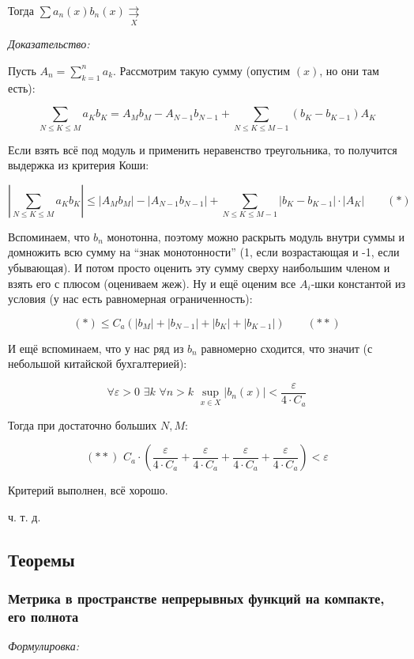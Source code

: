 \documentclass{article}
\def\dbl{\,\,}
\def\rsh#1{\underset{#1}{\rightrightarrows}}
\begin{document}
Тогда $\sum a_n(x) b_n(x) \rsh{X}$

\textit{Доказательство:}

Пусть $A_n = \sum_{k = 1}^n a_k$. Рассмотрим такую сумму (опустим $(x)$, но они там есть): 

\[
    \sum_{N \le K \le M} {a_K b_K} = A_Mb_M - A_{N - 1}b_{N - 1} + \sum_{N \le K \le M - 1} {(b_K - b_{K - 1})A_K}
\]

Если взять всё под модуль и применить неравенство треугольника, то получится выдержка из критерия Коши: 

\[
    \left|\sum_{N \le K \le M} {a_K b_K}\right| \le |A_Mb_M| - |A_{N - 1}b_{N - 1}| + \sum_{N \le K \le M - 1} {\left|b_K - b_{K - 1}\right| \cdot \left|A_K\right|} \qquad (*)
\]

Вспоминаем, что $b_n$ монотонна, поэтому можно раскрыть модуль внутри суммы и домножить всю сумму на ``знак монотонности'' (1, если возрастающая и -1, если убывающая). И потом просто оценить эту сумму сверху наибольшим членом и взять его с плюсом (оцениваем жеж). Ну и ещё оценим все $A_i$-шки константой из условия (у нас есть равномерная ограниченность):

\[
    (*) \le C_a \left( |b_M| + |b_{N - 1}| + |b_{K}| + |b_{K - 1}|\right) \qquad (**)    
\]

И ещё вспоминаем, что у нас ряд из $b_n$ равномерно сходится, что значит (с небольшой китайской бухгалтерией): 

\[ \forall \varepsilon > 0 \dbl \exists k \dbl \forall n > k \dbl \sup_{x \in X} |b_n(x)| < \frac{\varepsilon}{4 \cdot C_a} \]

Тогда при достаточно больших $N, M$:

\[(**) \dbl C_a \cdot \left(\frac{\varepsilon}{4 \cdot C_a} + \frac{\varepsilon}{4 \cdot C_a} + \frac{\varepsilon}{4 \cdot C_a} + \frac{\varepsilon}{4 \cdot C_a} \right) < \varepsilon\]

Критерий выполнен, всё хорошо.

ч. т. д.

\newpage

\subsection{Теоремы}

\subsubsection{Метрика в пространстве непрерывных функций на компакте, его полнота}
\textit{Формулировка:}
\end{document}
